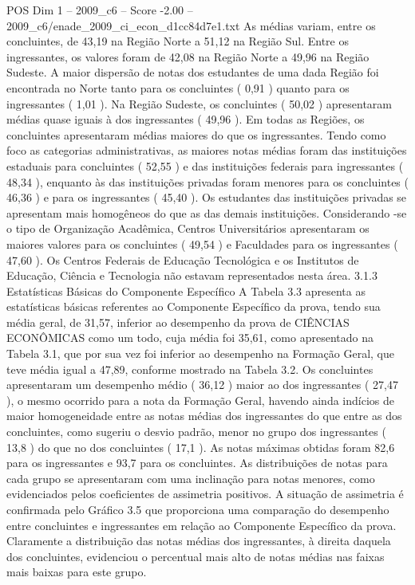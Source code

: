 \begin{textsample}{POS Dim 1 – 2009\_c6 – Score -2.00 – 2009\_c6/enade\_2009\_ci\_econ\_d1cc84d7e1.txt}
As médias variam, entre os concluintes, de 43,19 na Região Norte a 51,12 na Região Sul.
Entre os ingressantes, os valores foram de 42,08 na Região Norte a 49,96 na Região Sudeste.
A maior dispersão de notas dos estudantes de uma dada Região foi encontrada no Norte tanto para os concluintes ( 0,91 ) quanto para os ingressantes ( 1,01 ).
Na Região Sudeste, os concluintes ( 50,02 ) apresentaram médias quase iguais à dos ingressantes ( 49,96 ).
Em todas as Regiões, os concluintes apresentaram médias maiores do que os ingressantes.
Tendo como foco as categorias administrativas, as maiores notas médias foram das instituições estaduais para concluintes ( 52,55 ) e das instituições federais para ingressantes ( 48,34 ), enquanto às das instituições privadas foram menores para os concluintes ( 46,36 ) e para os ingressantes ( 45,40 ).
Os estudantes das instituições privadas se apresentam mais homogêneos do que as das demais instituições.
Considerando -se o tipo de Organização Acadêmica, Centros Universitários apresentaram os maiores valores para os concluintes ( 49,54 ) e Faculdades para os ingressantes ( 47,60 ).
Os Centros Federais de Educação Tecnológica e os Institutos de Educação, Ciência e Tecnologia não estavam representados nesta área. 3.1.3 Estatísticas Básicas do Componente Específico A Tabela 3.3 apresenta as estatísticas básicas referentes ao Componente Específico da prova, tendo sua média geral, de 31,57, inferior ao desempenho da prova de CIÊNCIAS ECONÔMICAS como um todo, cuja média foi 35,61, como apresentado na Tabela 3.1, que por sua vez foi inferior ao desempenho na Formação Geral, que teve média igual a 47,89, conforme mostrado na Tabela 3.2.
Os concluintes apresentaram um desempenho médio ( 36,12 ) maior ao dos ingressantes ( 27,47 ), o mesmo ocorrido para a nota da Formação Geral, havendo ainda indícios de maior homogeneidade entre as notas médias dos ingressantes do que entre as dos concluintes, como sugeriu o desvio padrão, menor no grupo dos ingressantes ( 13,8 ) do que no dos concluintes ( 17,1 ).
As notas máximas obtidas foram 82,6 para os ingressantes e 93,7 para os concluintes.
As distribuições de notas para cada grupo se apresentaram com uma inclinação para notas menores, como evidenciados pelos coeficientes de assimetria positivos.
A situação de assimetria é confirmada pelo Gráfico 3.5 que proporciona uma comparação do desempenho entre concluintes e ingressantes em relação ao Componente Específico da prova.
Claramente a distribuição das notas médias dos ingressantes, à direita daquela dos concluintes, evidenciou o percentual mais alto de notas médias nas faixas mais baixas para este grupo.

\end{textsample}
